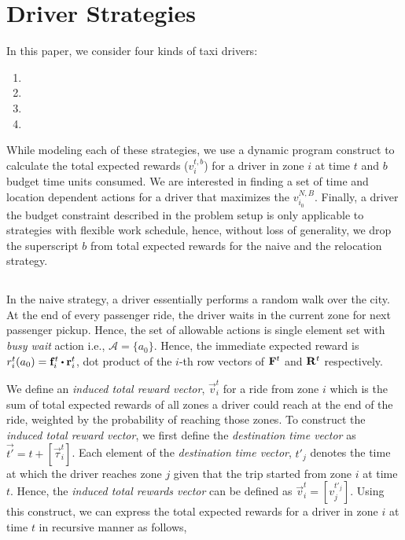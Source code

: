 
\section{Driver Strategies}
\label{sec:driver_strategies}

In this paper, we consider four kinds of taxi drivers:
\begin{enumerate}
    \item {\naive} 
    \item {\relocation} 
    \item {\flexible} 
    \item {\relocationflexible} 
\end{enumerate}

While modeling each of these strategies, we use a dynamic program construct to calculate the total expected rewards ($v_{i}^{t,b}$) for a driver in zone $i$ at time $t$ and $b$ budget time units consumed. We are interested in finding a set of time and location dependent actions for a driver that maximizes the $v_{i_0}^{N,B}$. Finally, a driver the budget constraint described in the problem setup is only applicable to strategies with flexible work schedule, hence, without loss of generality, we drop the superscript $b$ from total expected rewards for the naive and the relocation strategy.

\subsection{\naive}
In the naive strategy, a driver essentially performs a random walk over the city. At the end of every passenger ride, the driver waits in the current zone for next passenger pickup. Hence, the set of allowable actions is single element set with \textit{busy wait} action i.e., $\mathcal{A} = \{a_0\}$. Hence, the immediate expected reward is $r_{i}^{t}(a_0) = \vec{f}_{i}^{t} \bigcdot \vec{r}_{i}^{t}$, dot product of the $i$-th row vectors of $\mathbf{F}^{t}$ and $\mathbf{R}^{t}$ respectively. 

We define an \textit{induced total reward vector}, $\vec{v}_i^{t}$ for a ride from zone $i$ which is the sum of total expected rewards of all zones a driver could reach at the end of the ride, weighted by the probability of reaching those zones. To construct the \textit{induced total reward vector}, we first define the \textit{destination time vector} as $\vec{t'} = t + [\vec{\tau}_i^t]$. Each element of the \textit{destination time vector}, $t'_j$ denotes the time at which the driver reaches zone $j$ given that the trip started from zone $i$ at time $t$. Hence, the \textit{induced total rewards vector} can be defined as $\vec{v}_{i}^{t} = [v_{j}^{t'_j}]$. Using this construct, we can express the total expected rewards for a driver in zone $i$ at time $t$ in recursive manner as follows,


